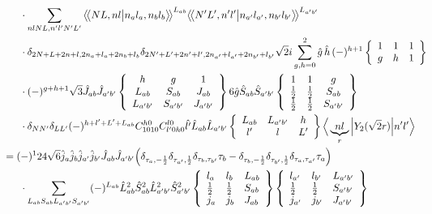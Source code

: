 \documentclass[master]{shnuthesis}
\newcommand{\llangle}{\big\langle\!\big\langle}
\newcommand{\rrangle}{\big\rangle\!\big\rangle}
\newcommand{\ap}{a^\prime}
\newcommand{\bp}{b^\prime}
\newcommand{\il}{\!\!\!\!\!\!\!\!\!\!}
\begin{document}
\begin{align}
    & \cdot \sum_{nlNL,n^\prime l^\prime N^\prime L^\prime} \llangle N L, n l \big| n_{a} l_{a}, n_{b} l_{b} \rrangle^{L_{ab}} \llangle N^\prime L^\prime, n^\prime l^\prime \big| n_{a^\prime} l_{a^\prime}, n_{b^\prime} l_{b^\prime} \rrangle^{L_{\ap\bp}} \notag\\
    & \cdot \delta_{2N+L+2n+l,2n_a+l_a+2n_b+l_b}\delta_{2N^\prime+L^\prime+2n^\prime+l^\prime,2n_{a^\prime}+l_{a^\prime}+2n_{b^\prime}+l_{b^\prime}} \sqrt{2}i \sum_{g,h=0}^2 \hat{g}\,\hat{h}\, (-)^{h+1}  \left\{\begin{array}{ccc} 1 & 1 & 1 \\ g & h & 1 \end{array}\right\}   \notag\\
    & \cdot (-)^{g+h+1}\sqrt{3}\hat{J}_{ab}\hat{J}_{\ap\bp}  \left\{\begin{array}{ccc} h & g & 1 \\ L_{ab} & S_{ab} & J_{ab} \\ L_{\ap\bp} & S_{\ap\bp} & J_{\ap\bp} \end{array}\right\}  6\hat{g}\hat{S}_{ab}\hat{S}_{\ap\bp}  \left\{\begin{array}{ccc} 1 & 1 & g \\ \frac{1}{2} & \frac{1}{2} & S_{ab} \\ \frac{1}{2} & \frac{1}{2} & S_{\ap\bp} \end{array}\right\} \notag\\
    & \cdot \delta_{NN^\prime}\delta_{LL^\prime}(-)^{h+l^\prime+L^\prime+L_{ab}}C_{1010}^{h0}C_{l^\prime 0 h 0}^{l0} \hat{l^\prime}\hat{L}_{ab}\hat{L}_{\ap\bp}  \left\{\begin{array}{ccc} L_{ab} & L_{\ap\bp} & h \\ l^\prime & l & L^\prime \end{array}\right\}  \Big\langle \underbrace{n l}_{r} \Big| Y_2(\sqrt{2}r) \Big| n^\prime l^\prime \Big\rangle \\
    &\il = (-)^{1} 24\sqrt{6} \hat{j}_a\hat{j}_b\hat{j}_{\ap}\hat{j}_{\bp}\hat{J}_{ab}\hat{J}_{\ap\bp} \Big( \delta_{\tau_a,-\frac{1}{2}}\delta_{\tau_{\ap},\frac{1}{2}}\delta_{\tau_b,\tau_{\bp}}\tau_b - \delta_{\tau_b,-\frac{1}{2}}\delta_{\tau_{\bp},\frac{1}{2}}\delta_{\tau_a,\tau_{\ap}}\tau_a \Big) \notag\\
    & \cdot \sum_{L_{ab}S_{ab}L_{\ap\bp}S_{\ap\bp}} (-)^{L_{ab}} \hat{L}_{ab}^2\hat{S}_{ab}^2\hat{L}_{\ap\bp}^2\hat{S}_{\ap\bp}^2  \left\{\begin{array}{lll}l_{a} & l_{b} & L_{ab} \\ \frac{1}{2} & \frac{1}{2} & S_{ab} \\j_{a} & j_{b} & J_{ab} \end{array}\right\} \left\{\begin{array}{lll}l_{\ap} & l_{\bp} & L_{\ap\bp} \\ \frac{1}{2} & \frac{1}{2} & S_{\ap\bp} \\j_{\ap} & j_{\bp} & J_{\ap\bp} \end{array}\right\}  \notag \\

\end{align}
\end{document}

